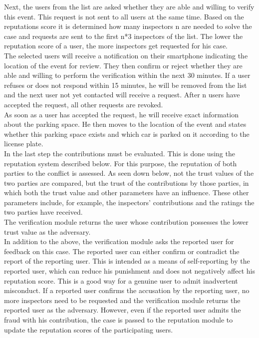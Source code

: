 Next, the users from the list are asked whether they are able and willing to verify this event. This request is not sent to all users at the same time. Based on the reputations score it is determined how many inspectors n are needed to solve the case and requests are sent to the first n*3 inspectors of the list. The lower the reputation score of a user, the more inspectors get requested for his case.\\

The selected users will receive a notification on their smartphone indicating the location of the event for review. They then confirm or reject whether they are able and willing to perform the verification within the next 30 minutes. If a user refuses or does not respond within 15 minutes, he will be removed from the list and the next user not yet contacted will receive a request. After n users have accepted the request, all other requests are revoked.\\

As soon as a user has accepted the request, he will receive exact information about the parking space. He then moves to the location of the event and states whether this parking space exists and which car is parked on it according to the license plate.\\

In the last step the contributions must be evaluated. This is done using the reputation system described below. For this purpose, the reputation of both parties to the conflict is assessed. As seen down below, not the trust values of the two parties are compared, but the trust of the contributions by those parties, in which both the trust value and other parameters have an influence. These other parameters include, for example, the inspectors' contributions and the ratings the two parties have received. \\

The verification module returns the user whose contribution possesses the lower trust value as the adversary. \\

In addition to the above, the verification module asks the reported user for feedback on this case. The reported user can either confirm or contradict the report of the reporting user. This is intended as a means of self-reporting by the reported user, which can reduce his punishment and does not negatively affect his reputation score. This is a good way for a genuine user to admit inadvertent misconduct. If a reported user confirms the accusation by the reporting user, no more inspectors need to be requested and the verification module returns the reported user as the adversary. However, even if the reported user admits the fraud with his contribution, the case is passed to the reputation module to update the reputation scores of the participating users.

